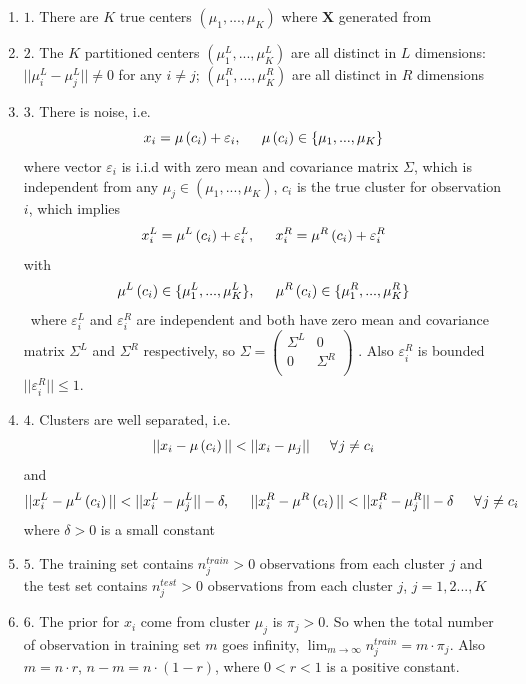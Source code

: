 \documentclass[11pt]{article}
\begin{document}
\begin{enumerate}[label={Assumption},leftmargin=*]
	\item $1.$ There are $K$ true centers $(\mu_1,...,\mu_K)$ where $\mathbf{X}$ generated from
	\item $2.$ The $K$ partitioned centers $(\mu^L_1,...,\mu^L_K)$ are all distinct in $L$ dimensions: $||\mu^L_i-\mu^L_j|| \neq 0$ for any $i \neq j$; $(\mu^R_1,...,\mu^R_K)$ are all distinct in $R$ dimensions
	\item $3.$ There is noise, i.e. $$x_i = \mu \left(c_i\right) + \varepsilon_i, \hspace{0.2 in} \mu \left(c_i\right) \in \{\mu_1,...,\mu_K\}$$ where vector $\varepsilon_i$ is i.i.d with zero mean and covariance matrix $\Sigma$, which is independent from any $\mu_j \in (\mu_1,...,\mu_K)$, $c_i$ is the true cluster for observation $i$, which implies $$x^L_i = \mu^L \left(c_i\right) + \varepsilon^L_i,\hspace{0.2in} x^R_i = \mu^R \left(c_i\right) + \varepsilon^R_i$$ 
with $$\mu^L\left(c_i\right) \in \{\mu^L_1,...,\mu^L_K\},\hspace{0.2in} \mu^R\left(c_i\right) \in \{\mu^R_1,...,\mu^R_K\} $$\
where $\varepsilon^L_i$ and $\varepsilon^R_i$ are independent and both have zero mean and covariance matrix $\Sigma^L$ and $\Sigma^R$ respectively, so $\Sigma = 
\begin{pmatrix}
  \Sigma^L &0\\
  0  &\Sigma^R\\
  \end{pmatrix}$
. Also $\varepsilon^R_i$ is bounded $||\varepsilon^R_i|| \leq 1$.
	\item $4.$ Clusters are well separated, i.e. \[ ||x_i-\mu \left(c_i\right)|| < ||x_i-\mu_{j}|| \hspace{0.2 in}\forall \hspace{0.01 in}j\neq c_i \] and \[ ||x^L_i-\mu^L \left(c_i\right)|| < ||x^L_i-\mu^L_{j}||-\delta,  \hspace{0.2 in}||x^R_i-\mu^R \left(c_i\right)|| < ||x^R_i-\mu^R_{j}||-\delta \hspace{0.2 in}\forall \hspace{0.01 in}j\neq c_i\] where $\delta > 0$ is a small constant 
	\item $5.$ The training set contains $n^{train}_j>0$ observations from each cluster $j$ and the test set contains $n^{test}_j > 0$ observations from each cluster $j$, $j=1,2...,K$
	\item $6.$ The prior for $x_i$ come from cluster $\mu_j$ is $\pi_j > 0$. So when the total number of observation in training set $m$ goes infinity, $\lim_{m\to \infty} n^{train}_j = m \cdot \pi_j $. Also $m=n\cdot r$, $n-m = n\cdot (1-r)$, where $0<r<1$ is a positive constant.
\end{enumerate}
\end{document}
